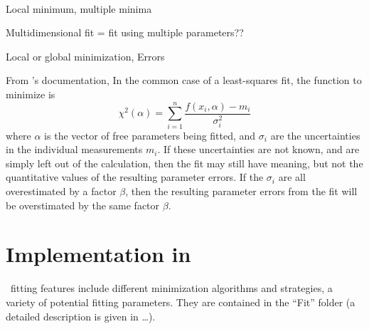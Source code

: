 \\


Local minimum, multiple minima

Multidimensional fit = fit using multiple parameters??

Local or global minimization, Errors


From 's documentation, In the common case of a least-squares
fit, the function to minimize is 
\begin{equation*}
\chi^2(\alpha)=\sum_{i=1}^n \frac{f(x_i,\alpha)-m_i}{\sigma_i^2}
\end{equation*}
where $\alpha$ is the vector of free parameters being fitted, and
$\sigma_i$ are the uncertainties in the individual measurements
$m_i$. If these uncertainties are not known, and are simply left out
of the calculation, then the fit may still have meaning, but not the
quantitative values of the resulting parameter errors. If the
$\sigma_i$ are all overestimated by a factor $\beta$, then the
resulting parameter errors from the fit will be overstimated by the
same factor $\beta$.




\section{Implementation in \BornAgain}
\BornAgain\ fitting features include different minimization
algorithms and strategies, a variety of potential fitting parameters. They are contained
in the ``Fit'' folder (a detailed description is given in \ldots). 

